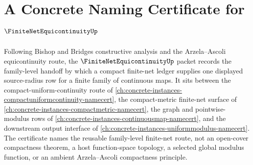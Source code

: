 \chapter{A Concrete Naming Certificate for $\FiniteNetEquicontinuityUp$}
\label{ch:concrete-instances-finite-net-equicontinuity-namecert}

Following Bishop and Bridges constructive analysis and the Arzela--Ascoli equicontinuity route, the $\FiniteNetEquicontinuityUp$ packet records the family-level handoff by which a compact finite-net ledger supplies one displayed source-radius row for a finite family of continuous maps. It sits between the compact-uniform-continuity route of \autoref{ch:concrete-instances-compactuniformcontinuity-namecert}, the compact-metric finite-net surface of \autoref{ch:concrete-instances-compactmetric-namecert}, the graph and pointwise-modulus rows of \autoref{ch:concrete-instances-continuousmap-namecert}, and the downstream output interface of \autoref{ch:concrete-instances-uniformmodulus-namecert}. The certificate names the reusable family-level finite-net route, not an open-cover compactness theorem, a host function-space topology, a selected global modulus function, or an ambient Arzela--Ascoli compactness principle.

